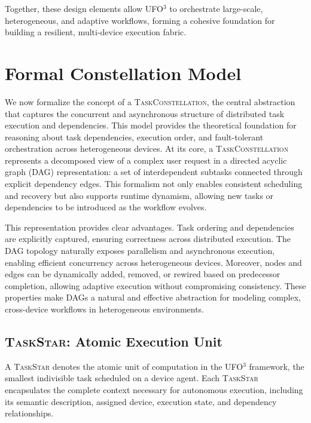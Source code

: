 \documentclass[10pt]{article} %
\newcommand{\ufo}{\textsc{UFO}$^3$\xspace}
\newcommand{\TaskConstellation}{\textsc{TaskConstellation}\xspace}
\newcommand{\TaskStar}{\textsc{TaskStar}\xspace}
\begin{document}
Together, these design elements allow \ufo to orchestrate large-scale, heterogeneous, and adaptive workflows, forming a cohesive foundation for building a resilient, multi-device execution fabric.





\section{Formal Constellation Model}
\label{sec:constellation-model}

We now formalize the concept of a \TaskConstellation, the central abstraction that captures the concurrent and asynchronous structure of distributed task execution and dependencies. This model provides the theoretical foundation for reasoning about task dependencies, execution order, and fault-tolerant orchestration across heterogeneous devices. At its core, a \TaskConstellation represents a decomposed view of a complex user request in a directed acyclic graph (DAG) representation: a set of interdependent subtasks connected through explicit dependency edges. This formalism not only enables consistent scheduling and recovery but also supports runtime dynamism, allowing new tasks or dependencies to be introduced as the workflow evolves.

This representation provides clear advantages. Task ordering and dependencies are explicitly captured, ensuring correctness across distributed execution. The DAG topology naturally exposes parallelism and asynchronous execution, enabling efficient concurrency across heterogeneous devices. Moreover, nodes and edges can be dynamically added, removed, or rewired based on predecessor completion, allowing adaptive execution without compromising consistency. These properties make DAGs a natural and effective abstraction for modeling complex, cross-device workflows in heterogeneous environments.


\subsection{\TaskStar: Atomic Execution Unit}
\label{subsec:taskstar}

A \TaskStar denotes the atomic unit of computation in the \ufo framework, the smallest indivisible task scheduled on a device agent. Each \TaskStar encapsulates the complete context necessary for autonomous execution, including its semantic description, assigned device, execution state, and dependency relationships.
\end{document}
